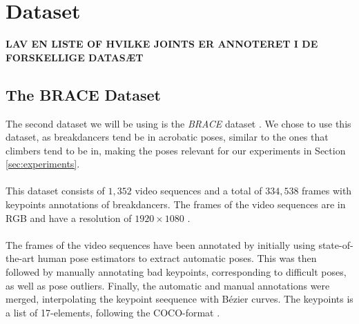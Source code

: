 \documentclass[./main.tex]{subfiles}
\begin{document}
\section{Dataset}

\textbf{LAV EN LISTE OF HVILKE JOINTS ER ANNOTERET I DE FORSKELLIGE DATASÆT}

\subsection{The BRACE Dataset}
The second dataset we will be using is the \textit{BRACE} dataset \cite{BRACE}. We chose to use this dataset, as breakdancers tend be in acrobatic poses, similar to the ones that climbers tend to be in, making the poses relevant for our experiments in Section \ref{sec:experiments}.
\\
\\
This dataset consists of $1,352$ video sequences and a total of $334,538$ frames with keypoints annotations of breakdancers. The frames of the video sequences are in RGB and have a resolution of $1920 \times 1080$ \cite{BRACE}.
\\
\\
The frames of the video sequences have been annotated by initially using state-of-the-art human pose estimators to extract automatic poses. This was then followed by manually annotating bad keypoints, corresponding to difficult poses, as well as pose outliers. Finally, the automatic and manual annotations were merged, interpolating the keypoint seequence with Bézier curves. The keypoints is a list of 17-elements, following the COCO-format \cite{BRACE}.
\end{document}
